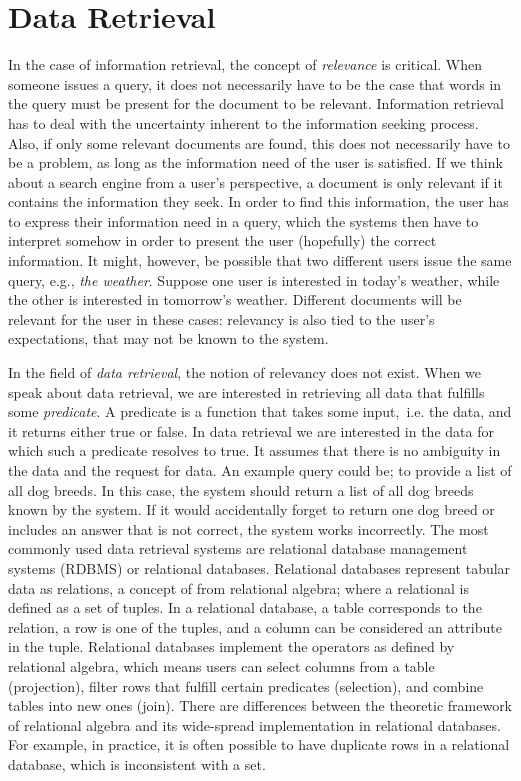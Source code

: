 \section{Data Retrieval}
In the case of information retrieval, the concept of \emph{relevance} is critical. When someone issues a query, it does not necessarily have to be the case that words in the query must be present for the document to be relevant. Information retrieval has to deal with the uncertainty inherent to the information seeking process. Also, if only some relevant documents are found, this does not necessarily have to be a problem, as long as the information need of the user is satisfied. If we think about a search engine from a user's perspective, a document is only relevant if it contains the information they seek. In order to find this information, the user has to express their information need in a query, which the systems then have to interpret somehow in order to present the user (hopefully) the correct information. 
It might, however, be possible that two different users issue the same query, e.g., \emph{the weather}. Suppose one user is interested in today's weather, while the other is interested in tomorrow's weather. Different documents will be relevant for the user in these cases: relevancy is also tied to the user's expectations, that may not be known to the system.

In the field of \emph{data retrieval}, the notion of relevancy does not exist. When we speak about data retrieval, we are interested in retrieving all data that fulfills some \emph{predicate}. A predicate is a function that takes some input,\ i.e. the data, and it returns either true or false. In data retrieval we are interested in the data for which such a predicate resolves to true. It assumes that there is no ambiguity in the data and the request for data. An example query could be; to provide a list of all dog breeds. In this case, the system should return a list of all dog breeds known by the system. If it would accidentally forget to return one dog breed or includes an answer that is not correct, the system works incorrectly. 
The most commonly used data retrieval systems are relational database management systems (RDBMS) or relational databases. Relational databases represent tabular data as relations, a concept of from relational algebra; where a relational is defined as a set of tuples. In a relational database, a table corresponds to the relation, a row is one of the tuples, and a column can be considered an attribute in the tuple. Relational databases implement the operators as defined by relational algebra, which means users can select columns from a table (projection), filter rows that fulfill certain predicates (selection), and combine tables into new ones (join). There are differences between the theoretic framework of relational algebra and its wide-spread implementation in relational databases. For example, in practice, it is often possible to have duplicate rows in a relational database, which is inconsistent with a set. 

